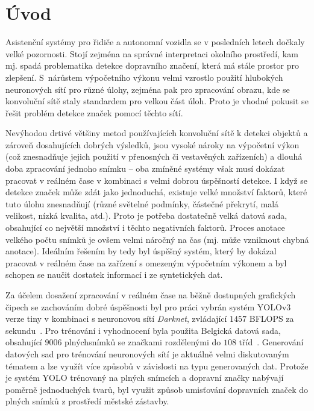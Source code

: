 \documentclass[czech]{ExcelAtFIT} %
\affiliation{*%
  \href{mailto:xkocic01@stud.fit.vutbr.cz}{xkocic01@stud.fit.vutbr.cz},
  \textit{Fakulta informačních technologií, Vysoké učení technické v Brně}}
\begin{document}
\sloppy

\startdocument



\section{Úvod}
Asistenční systémy pro řidiče a autonomní vozidla se v posledních letech dočkaly velké pozornosti. Stojí zejména na správné interpretaci okolního prostředí, kam mj. spadá problematika detekce dopravního značení, která má stále prostor pro zlepšení. S~nárůstem výpočetního výkonu velmi vzrostlo použití hlubokých neuronových sítí pro různé úlohy, zejména pak pro zpracování obrazu, kde se konvoluční sítě staly standardem pro velkou část úloh. Proto je vhodné pokusit se řešit problém detekce značek pomocí těchto sítí.


Nevýhodou drtivé většiny metod používajících konvoluční sítě k detekci objektů a zároveň dosahujících dobrých výsledků, jsou vysoké nároky na výpočetní výkon (což znesnadňuje jejich použití v přenosných či vestavěných zařízeních) a dlouhá doba zpracování jednoho snímku -- oba zmíněné systémy však musí dokázat pracovat v reálném čase v kombinaci s velmi dobrou úspěšností detekce.
I když se detekce značek může zdát jako jednoduchá, existuje velké množství faktorů, které tuto úlohu znesnadňují (různé světelné podmínky, částečné překrytí, malá velikost, nízká kvalita, atd.). Proto je potřeba dostatečně velká datová sada, obsahující co největší množství i těchto negativních faktorů. Proces anotace velkého počtu snímků je ovšem velmi náročný na čas (mj. může vzniknout chybná anotace).
Ideálním řešením by tedy byl úspěšný systém, který by dokázal pracovat v reálném čase na zařízení s omezeným výpočetním výkonem a byl schopen se naučit dostatek informací i ze syntetických dat.


Za účelem dosažení zpracování v reálném čase na běžně dostupných grafických čipech se zachováním dobré úspěšnosti byl pro práci vybrán systém YOLOv3 verze tiny v kombinaci s neuronovou sítí \emph{Darknet}, zvládající $1457$ BFLOPS za sekundu~\cite{yolov3,darknet}. Pro trénování i vyhodnocení byla použita Belgická datová sada, obsahující $9006$ plných\footnotemark[1] snímků se značkami rozdělenými do $108$ tříd~\cite{btsd}.
Generování datových sad pro trénování neuronových sítí je aktuálně velmi diskutovaným tématem a lze využít více způsobů v závislosti na typu generovaných dat. Protože je systém YOLO trénovaný na plných snímcích a dopravní značky nabývají poměrně jednoduchých tvarů, byl využit způsob umisťování dopravních značek do plných snímků z prostředí městské zástavby.
\end{document}
